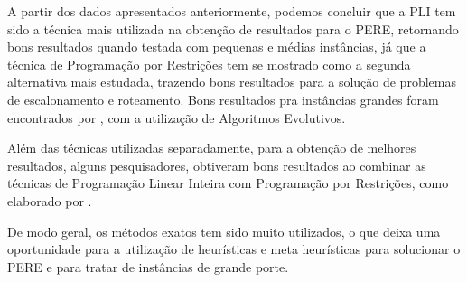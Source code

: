 A partir dos dados apresentados anteriormente, podemos concluir que a \ac{PLI} tem sido a técnica mais utilizada na obtenção de resultados para o \ac{PERE}, retornando bons resultados quando testada com pequenas e médias instâncias, já que a técnica de Programação por Restrições tem se mostrado como a segunda alternativa mais estudada, trazendo bons resultados para a solução de problemas de escalonamento e roteamento.
Bons resultados pra instâncias grandes foram encontrados por , com a utilização de Algoritmos Evolutivos.

Além das técnicas utilizadas separadamente, para a obtenção de melhores resultados, alguns pesquisadores, obtiveram bons resultados ao combinar as técnicas de Programação Linear Inteira com  Programação por Restrições, como elaborado por \cite{Bertels:2006}. 

De modo geral, os métodos exatos tem sido muito utilizados, o que deixa uma oportunidade para a utilização de heurísticas e meta heurísticas para solucionar o \ac{PERE} e para tratar de instâncias de grande porte.
